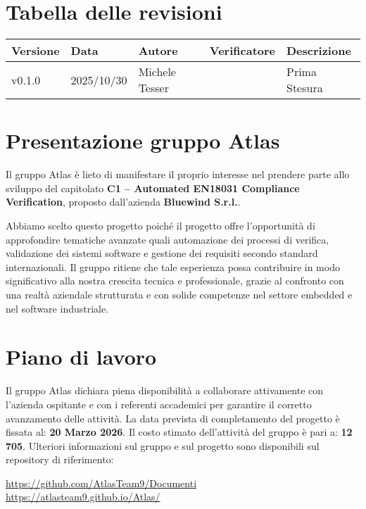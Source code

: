 \documentclass[a4paper,12pt]{article}
\begin{document}
\section*{Tabella delle revisioni}
    \begin{center} 
        \begin{tabular}{|l|l|l|l|l|}
            \hline
            \textbf{Versione} & \textbf{Data} & \textbf{Autore} & \textbf{Verificatore} & \textbf{Descrizione} \\
            \hline
            v0.1.0 & 2025/10/30 & Michele Tesser & & Prima Stesura \\
            \hline
        \end{tabular}
    \end{center}


\newpage

\section*{Presentazione gruppo Atlas}

Il gruppo Atlas è lieto di manifestare il proprio interesse nel prendere parte allo sviluppo del capitolato \textbf{C1 – Automated EN18031 Compliance Verification}, proposto dall'azienda \textbf{Bluewind S.r.l.}.

Abbiamo scelto questo progetto poiché il progetto offre l'opportunità di approfondire tematiche avanzate quali automazione dei processi di verifica, validazione dei sistemi software e gestione dei requisiti secondo standard internazionali. Il gruppo ritiene che tale esperienza possa contribuire in modo significativo alla nostra crescita tecnica e professionale, grazie al confronto con una realtà aziendale strutturata e con solide competenze nel settore embedded e nel software industriale.

\section*{Piano di lavoro}

Il gruppo Atlas dichiara piena disponibilità a collaborare attivamente con l’azienda ospitante e con i referenti accademici per garantire il corretto avanzamento delle attività.
La data prevista di completamento del progetto è fissata al: \textbf{20 Marzo 2026}.
Il costo stimato dell'attività del gruppo è pari a: \textbf{12 705\texteuro}.
Ulteriori informazioni sul gruppo e sul progetto sono disponibili sul repository di riferimento:

\begin{center}
    \url{https://github.com/AtlasTeam9/Documenti} \\
    \url{https://atlasteam9.github.io/Atlas/}
\end{center}
\end{document}
